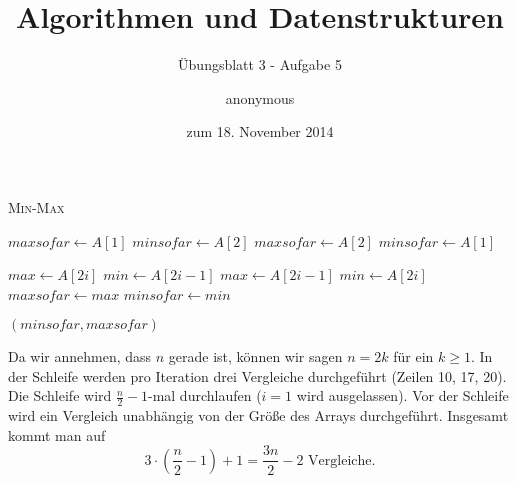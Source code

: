 \documentclass[a4paper]{scrartcl}
\title{Algorithmen und Datenstrukturen}
\subtitle{Übungsblatt 3 - Aufgabe 5}
\author{
    anonymous
}
\date{zum 18. November 2014}
\begin{document}
\maketitle


\begin{algorithm}
    \caption{\textsc{Min-Max}}
    \begin{algorithmic}[1]

            \State $maxsofar \gets A[1]$
            \State $minsofar \gets A[2]$
        \Else
            \State $maxsofar \gets A[2]$
            \State $minsofar \gets A[1]$
        \EndIf

                \State $max \gets A[2i]$
                \State $min \gets A[2i-1]$
            \Else
                \State $max \gets A[2i-1]$
                \State $min \gets A[2i]$
            \EndIf
                \State $maxsofar \gets max$
            \EndIf
                \State $minsofar \gets min$
            \EndIf
        \EndFor

        \State \Return $(minsofar, maxsofar)$

        \EndProcedure
    \end{algorithmic}
\end{algorithm}

Da wir annehmen, dass $n$ gerade ist, können wir sagen $n = 2k$ für ein
$k \geq 1$.
In der Schleife werden pro Iteration drei Vergleiche durchgeführt
(Zeilen 10, 17, 20).
Die Schleife wird $\frac{n}{2}-1$-mal durchlaufen ($i = 1$ wird ausgelassen).
Vor der Schleife wird ein Vergleich unabhängig von der Größe des Arrays
durchgeführt.
Insgesamt kommt man auf
\begin{equation}
    3 \cdot \left( \frac{n}{2} - 1 \right) + 1 = \frac{3n}{2} -2
    \text{ Vergleiche.}
\end{equation}
\end{document}
